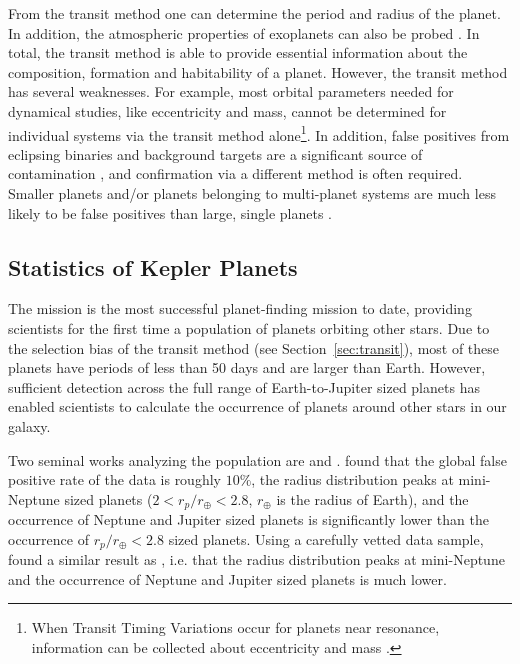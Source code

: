 From the transit method one can determine the period and radius of the planet. 
In addition, the atmospheric properties of exoplanets can also be probed \citep{Kreidberg2014, Tsiaras2016, Stevenson2016}.
In total, the transit method is able to provide essential information about the composition, formation and habitability of a planet. 
However, the transit method has several weaknesses. 
For example, most orbital parameters needed for dynamical studies, like eccentricity and mass, cannot be determined for individual systems via the transit method alone\footnote{When Transit Timing Variations occur for planets near resonance, information can be collected about eccentricity and mass \citep{Holman2005}.}.
In addition, false positives from eclipsing binaries and background targets are a significant source of contamination \citep{Fressin2013}, and confirmation via a different method is often required. 
Smaller planets and/or planets belonging to multi-planet systems are much less likely to be false positives than large, single planets \citep{Fressin2013}.

\subsection{Statistics of Kepler Planets}
\label{sec:stats}
The \kep mission is the most successful planet-finding mission to date, providing scientists for the first time a population of planets orbiting other stars. 
Due to the selection bias of the transit method (see Section~\ref{sec:transit}), most of these planets have periods of less than 50 days and are larger than Earth. 
However, sufficient detection across the full range of Earth-to-Jupiter sized planets has enabled scientists to calculate the occurrence of planets around other stars in our galaxy. 

Two seminal works analyzing the \kep population are \citet{Fressin2013} and \citet{Petigura2013}.
\citet{Fressin2013} found that the global false positive rate of the \kep data is roughly $10\%$, the radius distribution peaks at mini-Neptune sized planets ($2<r_p/r_{\oplus}<2.8$, $r_{\oplus}$ is the radius of Earth), and the occurrence of Neptune and Jupiter sized planets is significantly lower than the occurrence of $r_p/r_{\oplus}<2.8$ sized planets.
Using a carefully vetted data sample, \citet{Petigura2013} found a similar result as \citet{Fressin2013}, i.e. that the radius distribution peaks at mini-Neptune and the occurrence of Neptune and Jupiter sized planets is much lower.

